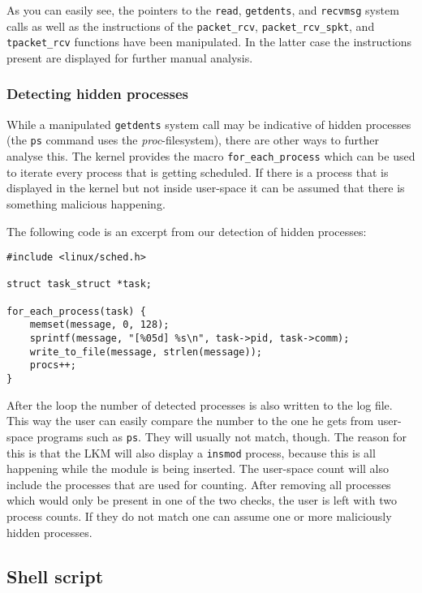 \documentclass[10pt, letterpaper]{scrartcl}
\begin{document}
As you can easily see, the pointers to the \texttt{read}, \texttt{getdents}, and \texttt{recvmsg} system calls as well as the instructions of the \texttt{packet\_rcv}, \texttt{packet\_rcv\_spkt}, and \texttt{tpacket\_rcv} functions have been manipulated. In the latter case the instructions present are displayed for further manual analysis.

\subsubsection{Detecting hidden processes}
While a manipulated \texttt{getdents} system call may be indicative of hidden processes (the \texttt{ps} command uses the \emph{proc}-filesystem), there are other ways to further analyse this.
The kernel provides the macro \texttt{for\_each\_process} which can be used to iterate every process that is getting scheduled.
If there is a process that is displayed in the kernel but not inside user-space it can be assumed that there is something malicious happening.

The following code is an excerpt from our detection of hidden processes:

\begin{lstlisting}
#include <linux/sched.h>

struct task_struct *task;

for_each_process(task) {
	memset(message, 0, 128);
	sprintf(message, "[%05d] %s\n", task->pid, task->comm);
	write_to_file(message, strlen(message));
	procs++;
}
\end{lstlisting}

After the loop the number of detected processes is also written to the log file.
This way the user can easily compare the number to the one he gets from user-space programs such as \texttt{ps}.
They will usually not match, though.
The reason for this is that the LKM will also display a \texttt{insmod} process, because this is all happening while the module is being inserted.
The user-space count will also include the processes that are used for counting.
After removing all processes which would only be present in one of the two checks, the user is left with two process counts.
If they do not match one can assume one or more maliciously hidden processes.


\subsection{Shell script}\label{sec:script}
\end{document}
